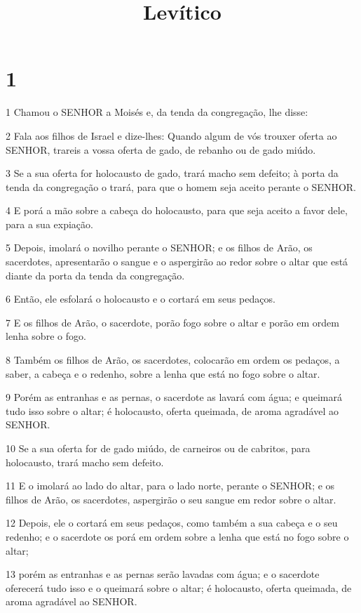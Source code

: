 

\title{Levítico}


\chapter{1}

\par 1 Chamou o SENHOR a Moisés e, da tenda da congregação, lhe disse:
\par 2 Fala aos filhos de Israel e dize-lhes: Quando algum de vós trouxer oferta ao SENHOR, trareis a vossa oferta de gado, de rebanho ou de gado miúdo.
\par 3 Se a sua oferta for holocausto de gado, trará macho sem defeito; à porta da tenda da congregação o trará, para que o homem seja aceito perante o SENHOR.
\par 4 E porá a mão sobre a cabeça do holocausto, para que seja aceito a favor dele, para a sua expiação.
\par 5 Depois, imolará o novilho perante o SENHOR; e os filhos de Arão, os sacerdotes, apresentarão o sangue e o aspergirão ao redor sobre o altar que está diante da porta da tenda da congregação.
\par 6 Então, ele esfolará o holocausto e o cortará em seus pedaços.
\par 7 E os filhos de Arão, o sacerdote, porão fogo sobre o altar e porão em ordem lenha sobre o fogo.
\par 8 Também os filhos de Arão, os sacerdotes, colocarão em ordem os pedaços, a saber, a cabeça e o redenho, sobre a lenha que está no fogo sobre o altar.
\par 9 Porém as entranhas e as pernas, o sacerdote as lavará com água; e queimará tudo isso sobre o altar; é holocausto, oferta queimada, de aroma agradável ao SENHOR.
\par 10 Se a sua oferta for de gado miúdo, de carneiros ou de cabritos, para holocausto, trará macho sem defeito.
\par 11 E o imolará ao lado do altar, para o lado norte, perante o SENHOR; e os filhos de Arão, os sacerdotes, aspergirão o seu sangue em redor sobre o altar.
\par 12 Depois, ele o cortará em seus pedaços, como também a sua cabeça e o seu redenho; e o sacerdote os porá em ordem sobre a lenha que está no fogo sobre o altar;
\par 13 porém as entranhas e as pernas serão lavadas com água; e o sacerdote oferecerá tudo isso e o queimará sobre o altar; é holocausto, oferta queimada, de aroma agradável ao SENHOR.
